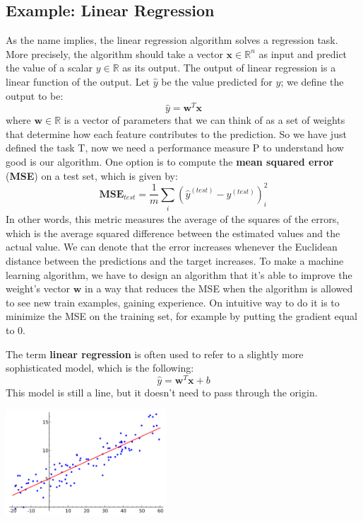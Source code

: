 \subsection{Example: Linear Regression}
As the name implies, the linear regression algorithm solves a regression task. More precisely, the algorithm should take a vector $\textbf{x} \in \mathbb{R}^n$ as input and predict the value of a scalar $y \in \mathbb{R}$ as its output. The output of linear regression is a linear function of the output. 
Let $\hat{y}$ be the value predicted for $y$; we define the output to be:
\begin{equation}
    \hat{y} = \textbf{w}^T\textbf{x}
\end{equation}
 where $\textbf{w}\in \mathbb{R}$ is a vector of parameters that we can think of as a set of weights that determine how each feature contributes to the prediction. So we have just defined the task T, now we need a performance measure P to understand how good is our algorithm.
 One option is to compute the \textbf{mean squared error} (\textbf{MSE}) on a test set, which is given by:
\begin{equation}
     \textbf{MSE}_{test} = \frac{1}{m}\sum_{\substack{i}}(\textbf{$\hat{y}$}^{(test)}-y^{(test)})^{2}_{i} 
\end{equation}
In other words, this metric measures the average of the squares of the errors, which is the average squared difference between the estimated values and the actual value. We can denote that the error increases whenever the Euclidean distance between the predictions and the target increases. To make a machine learning algorithm, we have to design an algorithm that it's able to improve the weight's vector $\textbf{w}$ in a way that reduces the MSE when the algorithm is allowed to see new train examples, gaining experience. On intuitive way to do it is to minimize the MSE on the training set, for example by putting the gradient equal to 0.

The term \textbf{linear regression} is often used to refer to a slightly more sophisticated model, which is the following:
\begin{equation}
    \hat{y} = \textbf{w}^T\textbf{x}+b
\end{equation}
This model is still a line, but it doesn't need to pass through the origin.

\vspace{0.5cm}
\begin{center}
    \includegraphics[width=0.45\textwidth]{images_0/linearegre.png}    
\end{center}

